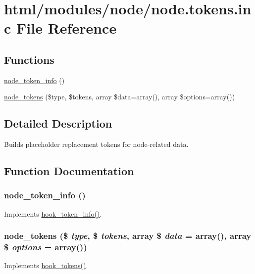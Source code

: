 \hypertarget{node_8tokens_8inc}{
\section{html/modules/node/node.tokens.inc File Reference}
\label{node_8tokens_8inc}
}
\subsection*{Functions}
\begin{DoxyCompactItemize}
\item 
\hyperlink{node_8tokens_8inc_a1eb2e7b3c2b97508731db13600f00ec4}{node\_\-token\_\-info} ()
\item 
\hyperlink{node_8tokens_8inc_a9493c88a2821910a57133a80463d5df7}{node\_\-tokens} (\$type, \$tokens, array \$data=array(), array \$options=array())
\end{DoxyCompactItemize}


\subsection{Detailed Description}
Builds placeholder replacement tokens for node-\/related data. 

\subsection{Function Documentation}
\hypertarget{node_8tokens_8inc_a1eb2e7b3c2b97508731db13600f00ec4}{
\subsubsection[{node\_\-token\_\-info}]{\setlength{\rightskip}{0pt plus 5cm}node\_\-token\_\-info ()}}
\label{node_8tokens_8inc_a1eb2e7b3c2b97508731db13600f00ec4}
Implements \hyperlink{group__hooks_gab868597197cf36911f95dcd29ae0b954}{hook\_\-token\_\-info()}. \hypertarget{node_8tokens_8inc_a9493c88a2821910a57133a80463d5df7}{
\subsubsection[{node\_\-tokens}]{\setlength{\rightskip}{0pt plus 5cm}node\_\-tokens (\$ {\em type}, \/  \$ {\em tokens}, \/  array \$ {\em data} = {\ttfamily array()}, \/  array \$ {\em options} = {\ttfamily array()})}}
\label{node_8tokens_8inc_a9493c88a2821910a57133a80463d5df7}
Implements \hyperlink{group__hooks_ga3bfd87d9a19b2397b0f970e1cff7ea4f}{hook\_\-tokens()}. 